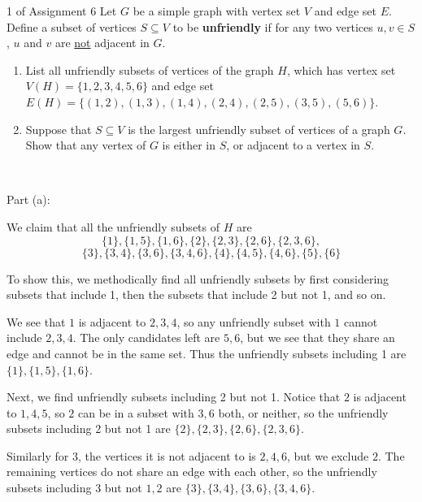 \documentclass{eh-homework}
\begin{document}
    \pagebreak
    \begin{question}{1 of Assignment 6}
        Let $G$ be a simple graph with vertex set $V$ and edge set $E$. 
        Define a subset of vertices $S \subseteq V$ to be \textbf{unfriendly} if for any two vertices $u,v \in S$, $u$ and $v$ are \underline{not} adjacent in $G$. 
        \begin{enumerate}[label=(\alph*)]
            \item List all unfriendly subsets of vertices of the graph $H$, which has vertex set $V(H) = \{1,2,3,4,5,6\}$ and edge set $E(H) = \{(1,2),(1,3),(1,4),(2,4),(2,5),(3,5),(5,6)\}$.
            \item Suppose that $S \subseteq V$ is the largest unfriendly subset of vertices of a graph $G$. 
            Show that any vertex of $G$ is either in $S$, or adjacent to a vertex in $S$.
        \end{enumerate}
        \tcblower
        \ 

        Part (a):

        We claim that all the unfriendly subsets of \(H\) are
        \[
            \{ 1 \} ,\{ 1,5 \} ,\{ 1,6 \},\{ 2 \} , \{ 2,3 \} , \{ 2,6 \} , \{ 2,3,6 \},
        \]
        \[
            \{ 3 \} , \{ 3,4 \} , \{ 3,6 \} , \{ 3,4,6 \},\{ 4 \}, \{ 4,5 \} , \{ 4,6 \},\{ 5 \}, \{ 6 \}
        \]

        To show this, we methodically find all unfriendly subsets by first considering subsets that include 1, then the subsets that include 2 but not 1, and so on.

        \smallskip

        We see that \(1\) is adjacent to \(2,3,4\), so any unfriendly subset with \(1\) cannot include \(2,3,4\). The only candidates left are \(5,6\), but we see that they share an edge and cannot be in the same set. Thus the unfriendly subsets including 1 are \(\{ 1 \} ,\{ 1,5 \} ,\{ 1,6 \}\).

        \smallskip

        Next, we find unfriendly subsets including 2 but not 1. Notice that \(2\) is adjacent to \(1,4,5\), so \(2\) can be in a subset with \(3,6\) both, or neither, so the unfriendly subsets including 2 but not 1 are \(\{ 2 \} , \{ 2,3 \} , \{ 2,6 \} , \{ 2,3,6 \}\).

        \smallskip

        Similarly for \(3\), the vertices it is not adjacent to is \(2,4,6\), but we exclude \(2\). The remaining vertices do not share an edge with each other, so the unfriendly subsets including \(3\) but not \(1,2\) are \(\{ 3 \} , \{ 3,4 \} , \{ 3,6 \} , \{ 3,4,6 \}\).


\end{question}
\end{document}
